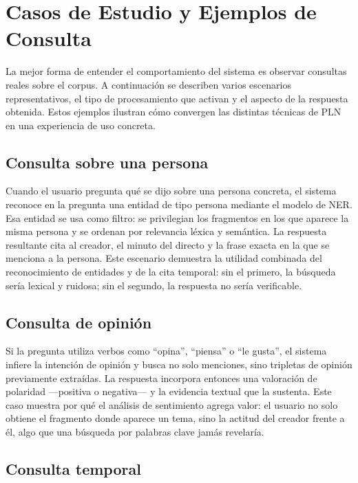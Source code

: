 \documentclass[12pt,a4paper]{article}
\begin{document}

\section{Casos de Estudio y Ejemplos de Consulta}
\label{sec:casos}

La mejor forma de entender el comportamiento del sistema es observar consultas reales sobre el corpus. A continuación se describen varios escenarios representativos, el tipo de procesamiento que activan y el aspecto de la respuesta obtenida. Estos ejemplos ilustran cómo convergen las distintas técnicas de PLN en una experiencia de uso concreta.

\subsection{Consulta sobre una persona}

Cuando el usuario pregunta qué se dijo sobre una persona concreta, el sistema reconoce en la pregunta una entidad de tipo persona mediante el modelo de NER. Esa entidad se usa como filtro: se privilegian los fragmentos en los que aparece la misma persona y se ordenan por relevancia léxica y semántica. La respuesta resultante cita al creador, el minuto del directo y la frase exacta en la que se menciona a la persona. Este escenario demuestra la utilidad combinada del reconocimiento de entidades y de la cita temporal: sin el primero, la búsqueda sería lexical y ruidosa; sin el segundo, la respuesta no sería verificable.

\subsection{Consulta de opinión}

Si la pregunta utiliza verbos como ``opina'', ``piensa'' o ``le gusta'', el sistema infiere la intención de opinión y busca no solo menciones, sino tripletas de opinión previamente extraídas. La respuesta incorpora entonces una valoración de polaridad —positiva o negativa— y la evidencia textual que la sustenta. Este caso muestra por qué el análisis de sentimiento agrega valor: el usuario no solo obtiene el fragmento donde aparece un tema, sino la actitud del creador frente a él, algo que una búsqueda por palabras clave jamás revelaría.

\subsection{Consulta temporal}
\end{document}
